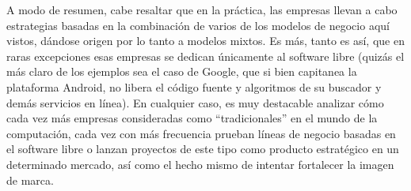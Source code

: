 A modo de resumen, cabe resaltar que en la práctica, las empresas llevan a cabo
estrategias basadas en la combinación de varios de los modelos de negocio aquí
vistos, dándose origen por lo tanto a modelos mixtos. Es más, tanto es así, que
en raras excepciones esas empresas se dedican únicamente al software libre
(quizás el más claro de los ejemplos sea el caso de Google, que si bien
capitanea la plataforma Android, no libera el código fuente y algoritmos de su
buscador y demás servicios en línea). En cualquier caso, es muy destacable
analizar cómo cada vez más empresas consideradas como ``tradicionales'' en el
mundo de la computación, cada vez con más frecuencia prueban líneas de negocio
basadas en el software libre o lanzan proyectos de este tipo como producto
estratégico en un determinado mercado, así como el hecho mismo de intentar
fortalecer la imagen de marca.

